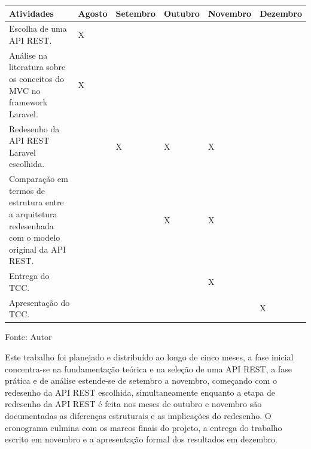 \begin{quadro}[H]
    \centering
    \caption{Cronograma TCC 2}
    \label{quadro:cronograma}
    \begin{tabularx}{\textwidth}{|p{4.4cm}|>{\centering\arraybackslash}X|>{\centering\arraybackslash}X|>{\centering\arraybackslash}X|>{\centering\arraybackslash}X|>{\centering\arraybackslash}X|}
        \hline
        \textbf{Atividades} &
        \textbf{Agosto} & 
        \textbf{Setembro} & 
        \textbf{Outubro} & 
        \textbf{Novembro} & 
        \textbf{Dezembro} \\
        \hline
        \hline
        Escolha de uma API REST. & X & & & & \\
        \hline
        Análise na literatura sobre os conceitos do MVC no framework Laravel. & X &  & & & \\
        \hline
        Redesenho da API REST Laravel escolhida. & & X & X & X & \\
        \hline
        Comparação em termos de estrutura entre a arquitetura redesenhada com o modelo original da API REST. & & & X & X & \\
        \hline
        Entrega do TCC. & & & & X & \\
        \hline
        Apresentação do TCC. & & & & & X \\
        \hline
    \end{tabularx}
    
    \par\medskip %
    Fonte: Autor
\end{quadro}


    \par Este trabalho foi planejado e distribuído ao longo de cinco meses, a fase inicial concentra-se na fundamentação teórica e na seleção de uma API REST, a fase prática e de análise estende-se de setembro a novembro, começando com o redesenho da API REST escolhida, simultaneamente enquanto a etapa de redesenho da API REST é feita nos meses de outubro e novembro são documentadas as diferenças estruturais e as implicações do redesenho. O cronograma culmina com os marcos finais do projeto, a entrega do trabalho escrito em novembro e a apresentação formal dos resultados em dezembro.